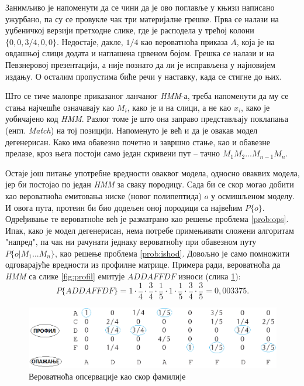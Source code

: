 \documentclass[12pt,oneside]{memoir}
\begin{document}
\begin{CJK}{UTF8}{ipxm}
Занимљиво је напоменути да се чини да је ово поглавље у књизи написано ужурбано, па су се провукле чак три материјалне грешке. Прва се налази на уџбеничкој верзији претходне слике, где је расподела у трећој колони $\{0, 0, 3/4, 0, 0\}$. Недостаје, дакле, $1/4$ као вероватноћа приказа $A$, која је на овдашњој слици додата и наглашена црвеном бојом. Грешка се налази и на Певзнеровој презентацији, а није познато да ли је исправљена у најновијем издању. О осталим пропустима биће речи у наставку, када се стигне до њих.

Што се тиче малопре приказаног ланчаног \textit{HMM}-а, треба напоменути да му се стања најчешће означавају као $M_i$, како је и на слици, а не као $x_i$, како је уобичајено код \textit{HMM}. Разлог томе је што она заправо представљају поклапања (енгл. \textit{Match}) на тој позицији. Напоменуто је већ и да је овакав модел дегенерисан. Како има обавезно почетно и завршно стање, као и обавезне прелазе, кроз њега постоји само један скривени пут -- тачно $M_1M_2...M_{n-1}M_n$.

Остаје још питање употребне вредности оваквог модела, односно оваквих модела, јер би постојао по један \textit{HMM} за сваку породицу. Сада би се скор могао добити као вероватноћа емитовања ниске (новог полипептида) $o$ у осмишљеном моделу. И овога пута, протеин би био додељен оној породици са највећим $P\{o\}$. Одређивање те вероватноће већ је разматрано као решење проблема \ref{prob:ops}. Ипак, како је модел дегенерисан, нема потребе примењивати сложени алгоритам "напред", па чак ни рачунати једнаку вероватноћу при обавезном путу $P\{o | M_1...M_n\}$, као решење проблема \ref{prob:ishod}. Довољно је само помножити одговарајуће вредности из профилне матрице. Примера ради, вероватноћа да \textit{HMM} са слике \ref{fig:profil} емитује $ADDAFFDF$ износи (слика \ref{fig:prof_ishod}): $$P\{ADDAFFDF\} = 1 \cdot \frac{1}{4} \cdot \frac{3}{4} \cdot \frac{1}{5} \cdot 1 \cdot \frac{1}{5} \cdot \frac{3}{4} \cdot \frac{3}{5} = 0,003375.$$

\begin{figure}[H]
  \centering
  \includegraphics[width=\textwidth]{prof_ishod.png}
  \caption{Вероватноћа опсервације као скор фамилије\cite{compeau2015}}
  \label{fig:prof_ishod}
\end{figure}


\end{CJK}
\end{document}

